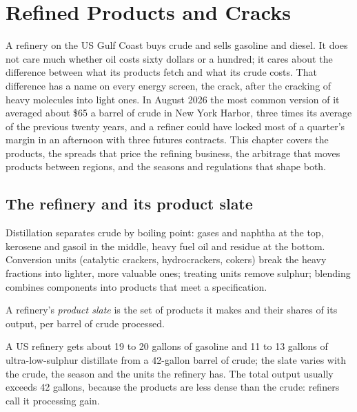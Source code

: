 \chapter{Refined Products and Cracks}\label{ch:m3:refined-products-and-cracks}

A refinery on the US Gulf Coast buys crude and sells gasoline and diesel. It does
not care much whether oil costs sixty dollars or a hundred; it cares about the
difference between what its products fetch and what its crude costs. That
difference has a name on every energy screen, the crack, after the cracking of
heavy molecules into light ones. In August 2026 the most common version of it
averaged about \$65 a barrel of crude in New York Harbor, three times its average
of the previous twenty years, and a refiner could have locked most of a quarter's
margin in an afternoon with three futures contracts. This chapter covers the
products, the spreads that price the refining business, the arbitrage that moves
products between regions, and the seasons and regulations that shape both.

\section{The refinery and its product slate}

Distillation separates crude by boiling point: gases and naphtha at the top,
kerosene and gasoil in the middle, heavy fuel oil and residue at the bottom.
Conversion units (catalytic crackers, hydrocrackers, cokers) break the heavy
fractions into lighter, more valuable ones; treating units remove sulphur;
blending combines components into products that meet a specification.

\begin{definition}\label{def:m3:refined-products-and-cracks:slate}
A refinery's \emph{product slate} is the set of products it
makes and their shares of its output, per barrel of crude processed.
\end{definition}

A US refinery gets about 19 to 20 gallons of gasoline and 11 to 13 gallons of
ultra-low-sulphur distillate from a 42-gallon barrel of crude; the slate varies
with the crude, the season and the units the refinery has. The total output
usually exceeds 42 gallons, because the products are less dense than the crude:
refiners call it processing gain.

